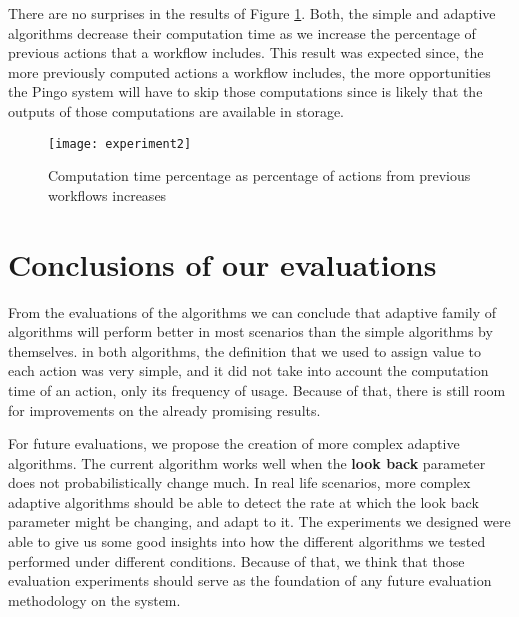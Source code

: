 There are no surprises in the results of Figure \ref{fig:experiment2}.  Both, the simple and adaptive algorithms decrease their computation time as we increase the percentage of previous actions that a workflow includes.  This result was expected since, the more previously computed actions a workflow includes, the more opportunities the Pingo system will have to skip those computations since is likely that the outputs of those computations are available in storage.

\begin{figure}
\centering
\texttt{[image: experiment2]}
\caption{Computation time percentage as percentage of actions from previous workflows increases}
\label{fig:experiment2}
\end{figure}

\section{Conclusions of our evaluations}
From the evaluations of the algorithms we can conclude that adaptive family of algorithms will perform better in most scenarios than the simple algorithms by themselves.  in both algorithms, the definition that we used to assign value to each action was very simple, and it did not take into account the computation time of an action, only its frequency of usage.  Because of that, there is still room for improvements on the already promising results. 

For future evaluations, we propose the creation of more complex adaptive algorithms.  The current algorithm works well when the \textbf{look back} parameter does not probabilistically change much.  In real life scenarios, more complex adaptive algorithms should be able to detect the rate at which the look back parameter might be changing, and adapt to it.
The experiments we designed were able to give us some good insights into how the different algorithms we tested performed under different conditions. Because of that, we think that those evaluation experiments should serve as the foundation of any future evaluation methodology on the system. 







